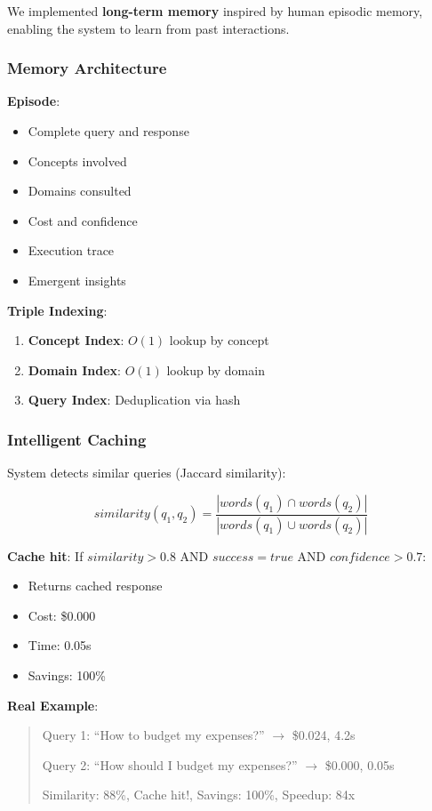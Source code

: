 \documentclass[11pt]{article}
\begin{document}
We implemented \textbf{long-term memory} inspired by human episodic memory, enabling the system to learn from past interactions.

\subsubsection{Memory Architecture}

\textbf{Episode}:
\begin{itemize}
    \item Complete query and response
    \item Concepts involved
    \item Domains consulted
    \item Cost and confidence
    \item Execution trace
    \item Emergent insights
\end{itemize}

\textbf{Triple Indexing}:
\begin{enumerate}
    \item \textbf{Concept Index}: $O(1)$ lookup by concept
    \item \textbf{Domain Index}: $O(1)$ lookup by domain
    \item \textbf{Query Index}: Deduplication via hash
\end{enumerate}

\subsubsection{Intelligent Caching}

System detects similar queries (Jaccard similarity):

\begin{equation}
similarity(q_1, q_2) = \frac{|words(q_1) \cap words(q_2)|}{|words(q_1) \cup words(q_2)|}
\end{equation}

\textbf{Cache hit}: If $similarity > 0.8$ AND $success = true$ AND $confidence > 0.7$:
\begin{itemize}
    \item Returns cached response
    \item Cost: \$0.000
    \item Time: 0.05s
    \item Savings: 100\%
\end{itemize}

\textbf{Real Example}:
\begin{quote}
Query 1: ``How to budget my expenses?'' $\rightarrow$ \$0.024, 4.2s

Query 2: ``How should I budget my expenses?'' $\rightarrow$ \$0.000, 0.05s

Similarity: 88\%, Cache hit!, Savings: 100\%, Speedup: 84x
\end{quote}
\end{document}
